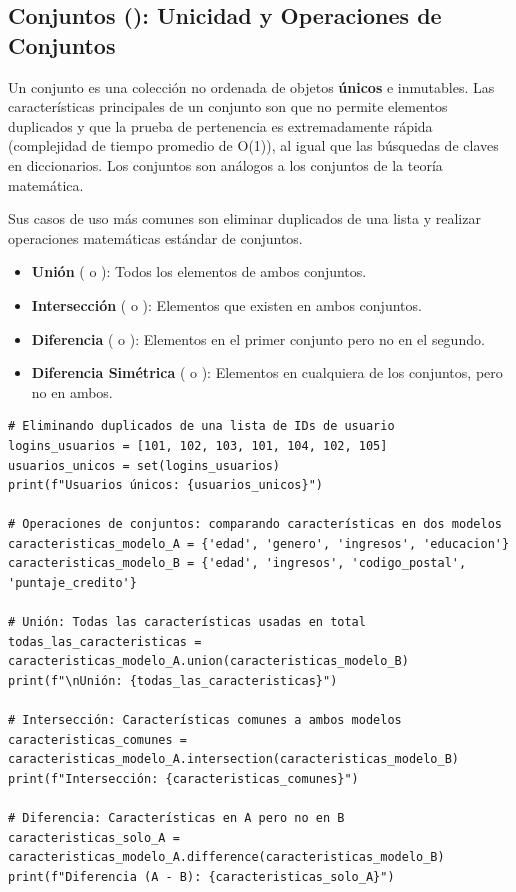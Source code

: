 \subsection{Conjuntos (): Unicidad y Operaciones de Conjuntos}
\label{subsec:sets}
Un conjunto es una colección no ordenada de objetos \textbf{únicos} e inmutables. Las características principales de un conjunto son que no permite elementos duplicados y que la prueba de pertenencia es extremadamente rápida (complejidad de tiempo promedio de O(1)), al igual que las búsquedas de claves en diccionarios. Los conjuntos son análogos a los conjuntos de la teoría matemática.

Sus casos de uso más comunes son eliminar duplicados de una lista y realizar operaciones matemáticas estándar de conjuntos.

\begin{itemize}
    \item \textbf{Unión} (\code{|} o ): Todos los elementos de ambos conjuntos.
    \item \textbf{Intersección} (\code{&} o ): Elementos que existen en ambos conjuntos.
    \item \textbf{Diferencia} (\code{-} o ): Elementos en el primer conjunto pero no en el segundo.
    \item \textbf{Diferencia Simétrica} (\code{^} o ): Elementos en cualquiera de los conjuntos, pero no en ambos.
\end{itemize}

\begin{example}
\text{ }\begin{verbatim}
# Eliminando duplicados de una lista de IDs de usuario
logins_usuarios = [101, 102, 103, 101, 104, 102, 105]
usuarios_unicos = set(logins_usuarios)
print(f"Usuarios únicos: {usuarios_unicos}")

# Operaciones de conjuntos: comparando características en dos modelos
caracteristicas_modelo_A = {'edad', 'genero', 'ingresos', 'educacion'}
caracteristicas_modelo_B = {'edad', 'ingresos', 'codigo_postal', 'puntaje_credito'}

# Unión: Todas las características usadas en total
todas_las_caracteristicas = caracteristicas_modelo_A.union(caracteristicas_modelo_B)
print(f"\nUnión: {todas_las_caracteristicas}")

# Intersección: Características comunes a ambos modelos
caracteristicas_comunes = caracteristicas_modelo_A.intersection(caracteristicas_modelo_B)
print(f"Intersección: {caracteristicas_comunes}")

# Diferencia: Características en A pero no en B
caracteristicas_solo_A = caracteristicas_modelo_A.difference(caracteristicas_modelo_B)
print(f"Diferencia (A - B): {caracteristicas_solo_A}")
\end{verbatim}
\end{example}

